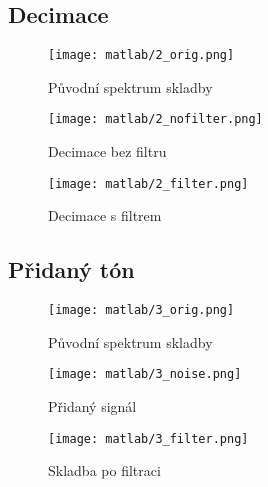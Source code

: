 \documentclass[11pt, a4paper]{article}
\begin{document}
        \subsection{Decimace}
        
            \begin{figure}[H]
                \centering
                \texttt{[image: matlab/2\_orig.png]}
                \caption{Původní spektrum skladby}
                \label{fig:3}
            \end{figure}
        
            \begin{figure}[H]
                \centering
                \begin{minipage}{.5\textwidth}
                    \centering
                    \texttt{[image: matlab/2\_nofilter.png]}
                    \caption{Decimace bez filtru}
                    \label{fig:4}
                \end{minipage}%
                \begin{minipage}{.5\textwidth}
                    \centering
                    \texttt{[image: matlab/2\_filter.png]}
                    \caption{Decimace s filtrem}
                    \label{fig:5}
                \end{minipage}
            \end{figure}
        
        \subsection{Přidaný tón}
        
            \begin{figure}[H]
                \centering
                \texttt{[image: matlab/3\_orig.png]}
                \caption{Původní spektrum skladby}
                \label{fig:6}
            \end{figure}
        
            \begin{figure}[H]
                \centering
                \begin{minipage}{.5\textwidth}
                    \centering
                    \texttt{[image: matlab/3\_noise.png]}
                    \caption{Přidaný signál}
                    \label{fig:7}
                \end{minipage}%
                \begin{minipage}{.5\textwidth}
                    \centering
                    \texttt{[image: matlab/3\_filter.png]}
                    \caption{Skladba po filtraci}
                    \label{fig:8}
                \end{minipage}
            \end{figure}
        
\end{document}
